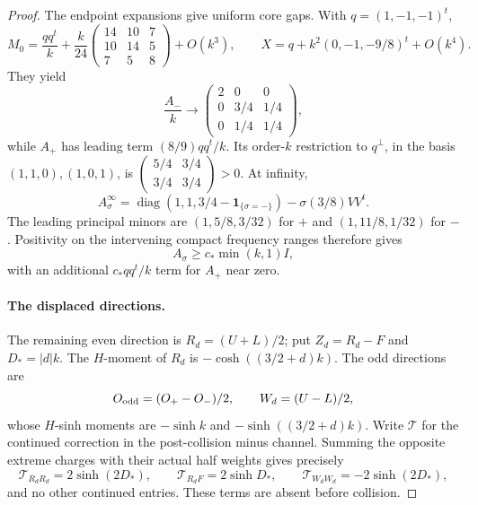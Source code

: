 \begin{proof}
The endpoint expansions give uniform core gaps. With \(q=(1,-1,-1)^t\),
\[
M_0=\frac{qq^t}{k}
+\frac{k}{24}\begin{pmatrix}14&10&7\\10&14&5\\7&5&8\end{pmatrix}
+O(k^3),\qquad
X=q+k^2(0,-1,-9/8)^t+O(k^4).
\]
They yield
\[
\frac{A_-}{k}\longrightarrow
\begin{pmatrix}2&0&0\\0&3/4&1/4\\0&1/4&1/4\end{pmatrix},
\]
while \(A_+\) has leading term \((8/9)qq^t/k\). Its order-\(k\) restriction to \(q^\perp\), in the basis \((1,1,0),(1,0,1)\), is
\(\left(\begin{smallmatrix}5/4&3/4\\3/4&3/4\end{smallmatrix}\right)>0\).
At infinity,
\[
A_\sigma^\infty
=\operatorname{diag}(1,1,3/4-\mathbf1_{\{\sigma=-\}})
-\sigma(3/8)VV^t.
\]
The leading principal minors are \((1,5/8,3/32)\) for \(+\) and \((1,11/8,1/32)\) for \(-\). Positivity on the intervening compact frequency ranges therefore gives
\[
A_\sigma\ge c_*\min(k,1)I,
\]
with an additional \(c_*qq^t/k\) term for \(A_+\) near zero.

\paragraph{The displaced directions.}
The remaining even direction is \(R_d=(U+L)/2\); put \(Z_d=R_d-F\) and \(D_*=|d|k\). The \(H\)-moment of \(R_d\) is \(-\cosh((3/2+d)k)\). The odd directions are
\[
O_{\rm odd}=(O_+-O_-)/2,\qquad W_d=(U-L)/2,
\]
whose \(H\)-sinh moments are \(-\sinh k\) and \(-\sinh((3/2+d)k)\). Write \(\mathcal T\) for the continued correction in the post-collision minus channel. Summing the opposite extreme charges with their actual half weights gives precisely
\begin{equation}\label{j:height-continuations}
\mathcal T_{R_dR_d}=2\sinh(2D_*),\qquad
\mathcal T_{R_dF}=2\sinh D_*,\qquad
\mathcal T_{W_dW_d}=-2\sinh(2D_*),
\end{equation}
and no other continued entries. These terms are absent before collision.


\end{proof}
